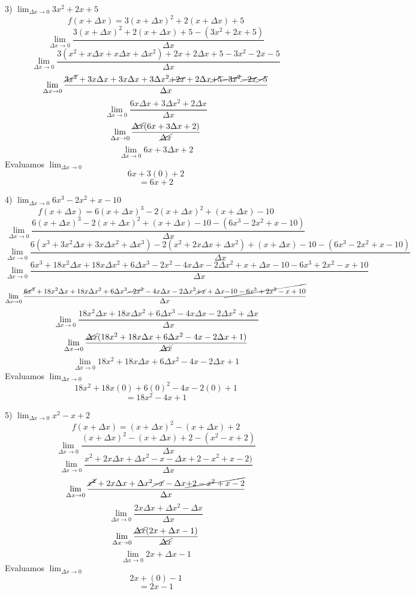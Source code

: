 \documentclass[11pt]{report}
\begin{document}
3) $\lim_{\Delta x \to 0} 3x^2+2x+5$
$$f(x+\Delta x)=3(x+\Delta x)^2+2(x+\Delta x)+5$$
$$\lim_{\Delta x \to 0}\frac{3(x+\Delta x)^2+2(x+\Delta x)+5-(3x^2+2x+5)}{\Delta x}$$
$$\lim_{\Delta x \to 0}\frac{3(x^2+x\Delta x+x\Delta x+\Delta x^2)+2x+2\Delta x+5-3x^2-2x-5}{\Delta x}$$
$$\lim_{\Delta x \to 0}\frac{\cancel{3x^2}+3x\Delta x+3x\Delta x+3\Delta x^2\cancel{+2x}+2\Delta x\cancel{+5}\cancel{-3x^2}\cancel{-2x}\cancel{-5}}{\Delta x}$$
$$\lim_{\Delta x \to 0}\frac{6x\Delta x+3\Delta x^2+2\Delta x}{\Delta x}$$
$$\lim_{\Delta x \to 0}\frac{\cancel{\Delta x}(6x+3\Delta x+2)}{\cancel{\Delta x}}$$
$$\lim_{\Delta x \to 0}6x+3\Delta x+2$$
Evaluamos $\lim_{\Delta x \to 0}$
$$6x+3(0)+2$$
$$=6x+2$$

4) $\lim_{\Delta x \to 0} 6x^3-2x^2+x-10$
$$f(x+\Delta x)=6(x+\Delta x)^3-2(x+\Delta x)^2+(x+\Delta x)-10$$
$$\lim_{\Delta x \to 0}\frac{6(x+\Delta x)^3-2(x+\Delta x)^2+(x+\Delta x)-10-(6x^3-2x^2+x-10)}{\Delta x}$$
$$\lim_{\Delta x \to 0}\frac{6(x^3+3x^2\Delta x+3x\Delta x^2+\Delta x^3)-2(x^2+2x\Delta x+\Delta x^2)+(x+\Delta x)-10-(6x^3-2x^2+x-10)}{\Delta x}$$
$$\lim_{\Delta x \to 0}\frac{6x^3+18x^2\Delta x+18x\Delta x^2+6\Delta x^3-2x^2-4x\Delta x-2\Delta x^2+x+\Delta x-10-6x^3+2x^2-x+10}{\Delta x}$$
$$\lim_{\Delta x \to 0}\frac{\cancel{6x^3}+18x^2\Delta x+18x\Delta x^2+6\Delta x^3\cancel{-2x^2}-4x\Delta x-2\Delta x^2\cancel{+x}+\Delta x\cancel{-10-6x^3+2x^2-x+10}}{\Delta x}$$
$$\lim_{\Delta x \to 0}\frac{18x^2\Delta x+18x\Delta x^2+6\Delta x^3-4x\Delta x-2\Delta x^2+\Delta x}{\Delta x}$$
$$\lim_{\Delta x \to 0}\frac{\cancel{\Delta x}(18x^2+18x\Delta x+6\Delta x^2-4x-2\Delta x+1)}{\cancel{\Delta x}}$$
$$\lim_{\Delta x \to 0}18x^2+18x\Delta x+6\Delta x^2-4x-2\Delta x+1$$
Evaluamos $\lim_{\Delta x \to 0}$
$$18x^2+18x(0)+6(0)^2-4x-2(0)+1$$
$$=18x^2-4x+1$$

5) $\lim_{\Delta x \to 0} x^2-x+2$
$$f(x+\Delta x)=(x+\Delta x)^2-(x+\Delta x)+2$$
$$\lim_{\Delta x \to 0}\frac{(x+\Delta x)^2-(x+\Delta x)+2-(x^2-x+2)}{\Delta x}$$
$$\lim_{\Delta x \to 0}\frac{x^2+2x\Delta x +\Delta x^2-x-\Delta x+2-x^2+x-2)}{\Delta x}$$
$$\lim_{\Delta x \to 0}\frac{\cancel{x^2}+2x\Delta x +\Delta x^2\cancel{-x}-\Delta x\cancel{+2-x^2+x-2}}{\Delta x}$$
$$\lim_{\Delta x \to 0}\frac{2x\Delta x +\Delta x^2-\Delta x}{\Delta x}$$
$$\lim_{\Delta x \to 0}\frac{\cancel{\Delta x}(2x+\Delta x-1)}{\cancel{\Delta x}}$$
$$\lim_{\Delta x \to 0}2x+\Delta x-1$$
Evaluamos $\lim_{\Delta x \to 0}$
$$2x+(0)-1$$
$$=2x-1$$
\end{document}
